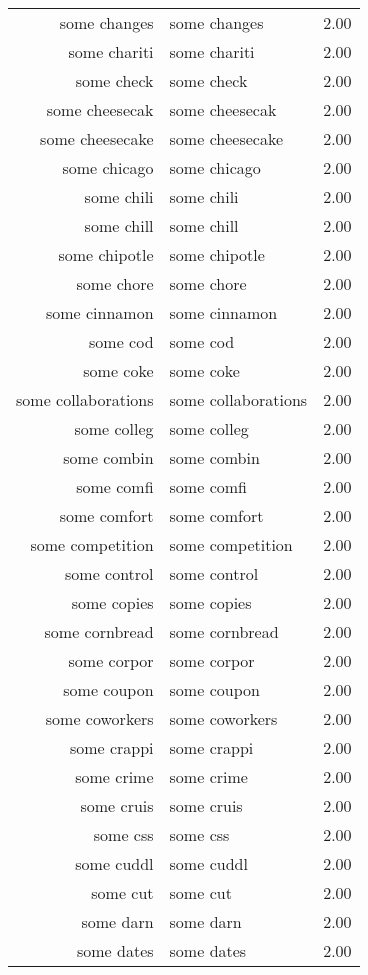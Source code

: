 \begin{table}[ht]
\begin{tabular}{rlr}
  some changes & some changes & 2.00 \\ 
  some chariti & some chariti & 2.00 \\ 
  some check & some check & 2.00 \\ 
  some cheesecak & some cheesecak & 2.00 \\ 
  some cheesecake & some cheesecake & 2.00 \\ 
  some chicago & some chicago & 2.00 \\ 
  some chili & some chili & 2.00 \\ 
  some chill & some chill & 2.00 \\ 
  some chipotle & some chipotle & 2.00 \\ 
  some chore & some chore & 2.00 \\ 
  some cinnamon & some cinnamon & 2.00 \\ 
  some cod & some cod & 2.00 \\ 
  some coke & some coke & 2.00 \\ 
  some collaborations & some collaborations & 2.00 \\ 
  some colleg & some colleg & 2.00 \\ 
  some combin & some combin & 2.00 \\ 
  some comfi & some comfi & 2.00 \\ 
  some comfort & some comfort & 2.00 \\ 
  some competition & some competition & 2.00 \\ 
  some control & some control & 2.00 \\ 
  some copies & some copies & 2.00 \\ 
  some cornbread & some cornbread & 2.00 \\ 
  some corpor & some corpor & 2.00 \\ 
  some coupon & some coupon & 2.00 \\ 
  some coworkers & some coworkers & 2.00 \\ 
  some crappi & some crappi & 2.00 \\ 
  some crime & some crime & 2.00 \\ 
  some cruis & some cruis & 2.00 \\ 
  some css & some css & 2.00 \\ 
  some cuddl & some cuddl & 2.00 \\ 
  some cut & some cut & 2.00 \\ 
  some darn & some darn & 2.00 \\ 
  some dates & some dates & 2.00 \\ 

\end{tabular}
\end{table}
